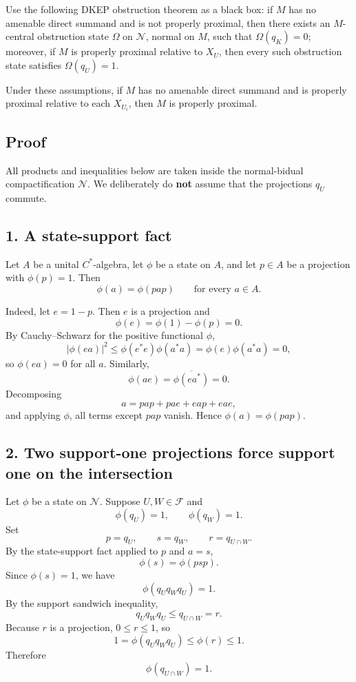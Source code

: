 \documentclass[12pt]{article}
\begin{document}
Use the following DKEP obstruction theorem as a black box: if \(M\) has no amenable direct summand and is not properly proximal, then there exists an \(M\)-central obstruction state \(\Omega\) on \(\mathcal N\), normal on \(M\), such that \(\Omega(q_K)=0\); moreover, if \(M\) is properly proximal relative to \(X_U\), then every such obstruction state satisfies \(\Omega(q_U)=1\).

Under these assumptions, if \(M\) has no amenable direct summand and is properly proximal relative to each \(X_{U_i}\), then \(M\) is properly proximal.

\subsection*{Proof}

All products and inequalities below are taken inside the normal-bidual compactification \(\mathcal N\). We deliberately do \textbf{not} assume that the projections \(q_U\) commute.

\subsection*{1. A state-support fact}

Let \(A\) be a unital \(C^*\)-algebra, let \(\phi\) be a state on \(A\), and let \(p\in A\) be a projection with \(\phi(p)=1\). Then
\[
\phi(a)=\phi(pap)
\qquad\text{for every }a\in A.
\]

Indeed, let \(e=1-p\). Then \(e\) is a projection and
\[
\phi(e)=\phi(1)-\phi(p)=0.
\]
By Cauchy–Schwarz for the positive functional \(\phi\),
\[
|\phi(ea)|^2\le \phi(e^*e)\phi(a^*a)=\phi(e)\phi(a^*a)=0,
\]
so \(\phi(ea)=0\) for all \(a\). Similarly,
\[
\phi(ae)=\overline{\phi(ea^*)}=0.
\]
Decomposing
\[
a=pap+pae+eap+eae,
\]
and applying \(\phi\), all terms except \(pap\) vanish. Hence \(\phi(a)=\phi(pap)\).

\subsection*{2. Two support-one projections force support one on the intersection}

Let \(\phi\) be a state on \(\mathcal N\). Suppose \(U,W\in\mathcal F\) and
\[
\phi(q_U)=1,\qquad \phi(q_W)=1.
\]
Set
\[
p=q_U,\qquad s=q_W,\qquad r=q_{U\cap W}.
\]
By the state-support fact applied to \(p\) and \(a=s\),
\[
\phi(s)=\phi(psp).
\]
Since \(\phi(s)=1\), we have
\[
\phi(q_Uq_Wq_U)=1.
\]
By the support sandwich inequality,
\[
q_Uq_Wq_U\le q_{U\cap W}=r.
\]
Because \(r\) is a projection, \(0\le r\le 1\), so
\[
1=\phi(q_Uq_Wq_U)\le \phi(r)\le 1.
\]
Therefore
\[
\phi(q_{U\cap W})=1.
\]
\end{document}
